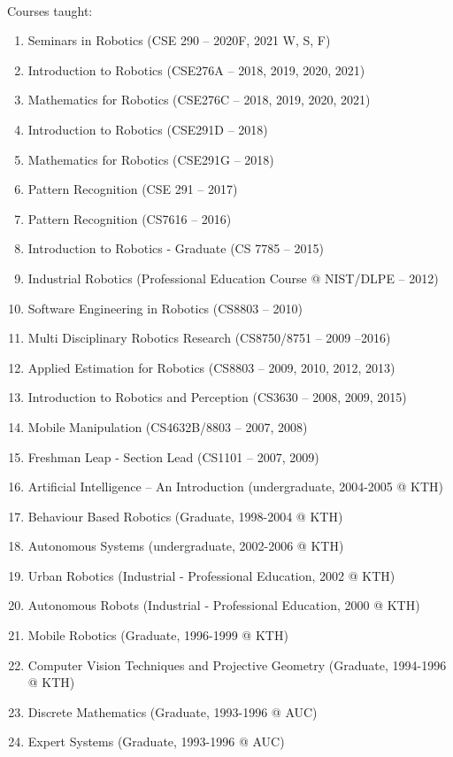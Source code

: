 \documentclass{article}
\begin{document}
\begin{cv}
\begin{cvlist}{~}
\item[Courses taught:]
  \begin{enumerate}
  \item Seminars in Robotics (CSE 290 -- 2020F, 2021 W, S, F)
  \item Introduction to Robotics (CSE276A -- 2018, 2019, 2020, 2021)
  \item Mathematics for Robotics (CSE276C -- 2018, 2019, 2020, 2021)
  \item Introduction to Robotics (CSE291D -- 2018)
  \item Mathematics for Robotics (CSE291G -- 2018)
  \item Pattern Recognition (CSE 291 -- 2017)
  \item Pattern Recognition (CS7616 -- 2016)
  \item Introduction to Robotics - Graduate (CS 7785 -- 2015)
  \item Industrial Robotics (Professional Education Course @ NIST/DLPE
    -- 2012)
  \item Software Engineering in Robotics (CS8803 -- 2010)
  \item Multi Disciplinary Robotics Research (CS8750/8751 -- 2009 --2016)
  \item Applied Estimation for Robotics (CS8803 -- 2009, 2010, 2012, 2013)
  \item Introduction to Robotics and Perception (CS3630 -- 2008, 2009, 2015)
  \item Mobile Manipulation (CS4632B/8803 -- 2007, 2008)
  \item Freshman Leap - Section Lead (CS1101 -- 2007, 2009)
  \item Artificial Intelligence -- An Introduction (undergraduate,
    2004-2005 @ KTH)
  \item Behaviour Based Robotics (Graduate, 1998-2004 @ KTH)
  \item Autonomous Systems (undergraduate, 2002-2006 @ KTH)
  \item Urban Robotics (Industrial - Professional Education, 2002 @ KTH)
  \item Autonomous Robots (Industrial - Professional Education, 2000 @  KTH)
  \item Mobile Robotics (Graduate, 1996-1999 @ KTH)
  \item Computer Vision Techniques and Projective Geometry (Graduate,
    1994-1996 @ KTH)
  \item Discrete Mathematics (Graduate, 1993-1996 @ AUC)
  \item Expert Systems (Graduate, 1993-1996 @ AUC)

\end{enumerate}
\end{cvlist}
\end{cv}
\end{document}
